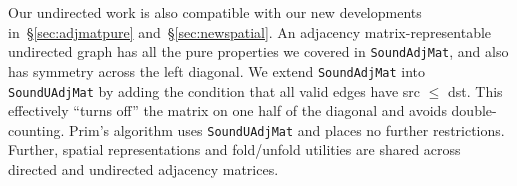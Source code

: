Our undirected work is also compatible with our new developments 
in~\S\ref{sec:adjmatpure} and~\S\ref{sec:newspatial}. 
An adjacency matrix-representable undirected graph  
has all the pure properties we covered in \texttt{SoundAdjMat},
and also has symmetry across the left diagonal.
We extend \texttt{SoundAdjMat} into
\texttt{Sound{\color{red}U}AdjMat} by adding the condition that 
all valid edges have src $\le$ dst. This effectively ``turns off'' the 
matrix on one half of the diagonal and avoids double-counting. Prim's algorithm uses 
\texttt{SoundUAdjMat} and places no further restrictions.
Further, spatial representations and fold/unfold utilities are shared
across directed and undirected adjacency matrices.


\lstset{style=myTinyStyle}



